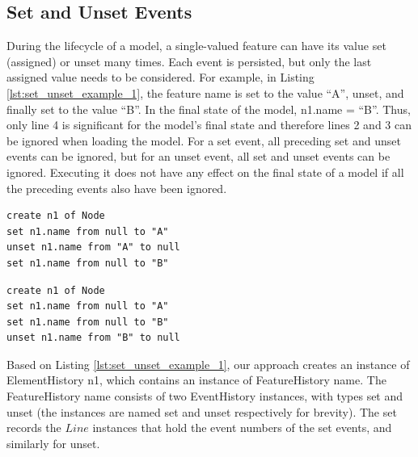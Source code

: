 \subsection{Set and Unset Events}
\label{subsec:set_and_unset_operations}
During the lifecycle of a model, a single-valued feature can have its value set (assigned) or unset many times. Each event is persisted, but only the last assigned value needs to be considered. For example, in Listing \ref{lst:set_unset_example_1}, the feature \textsf{name} is set to the value “A”, unset, and finally set to the value “B”. In the final state of the model, \textsf{n1.name} = “B”. Thus, only line 4 is significant for the model’s final state and therefore lines 2 and 3 can be ignored when loading the model. For a \textsf{set} event, all preceding \textsf{set} and \textsf{unset} events can be ignored, but for an \textsf{unset} event, all \textsf{set} and \textsf{unset} events can be ignored. Executing it does not have any effect on the final state of a model if all the preceding events also have been ignored.

\vspace{-20pt}
\begin{minipage}[t]{0.49\linewidth}
\begin{lstlisting}[style=eol,caption={A CBP representation of attribute \textsf{name} assignments ended with SET.},label=lst:set_unset_example_1]
create n1 of Node
set n1.name from null to "A"
unset n1.name from "A" to null
set n1.name from null to "B"
\end{lstlisting}
\end{minipage}
\hfill
\begin{minipage}[t]{0.49\linewidth}
\begin{lstlisting}[style=eol,caption={A CBP representation of attribute \textsf{name} assignments ended with UNSET.},label=lst:set_unset_example_2]
create n1 of Node
set n1.name from null to "A"
set n1.name from null to "B"
unset n1.name from "B" to null
\end{lstlisting}
\end{minipage}

Based on Listing \ref{lst:set_unset_example_1}, our approach creates an instance of \textsf{ElementHistory} \textsf{n1}, which contains an instance of \textsf{FeatureHistory} \textsf{name}. The \textsf{FeatureHistory} \textsf{name} consists of two \textsf{EventHistory} instances, with types \textsf{set} and \textsf{unset} (the instances are named \textsf{set} and \textsf{unset} respectively for brevity). The \textsf{set} records the $Line$ instances that hold the event numbers of the \textsf{set} events, and similarly for \textsf{unset}.

